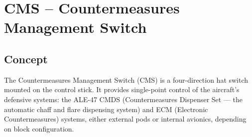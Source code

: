 \documentclass[11pt, a4paper, twoside]{report}
\begin{document}
\chapter{CMS – Countermeasures Management Switch}
\label{chap:C5}

\section{Concept}
\label{sec:C5-S1}

The Countermeasures Management Switch (CMS) is a four-direction hat switch mounted on the control stick. It provides single-point control of the aircraft's defensive systems: the ALE-47 CMDS (Countermeasures Dispenser Set — the automatic chaff and flare dispensing system) and ECM (Electronic Countermeasures) systems, either external pods or internal avionics, depending on block configuration.

\end{document}
